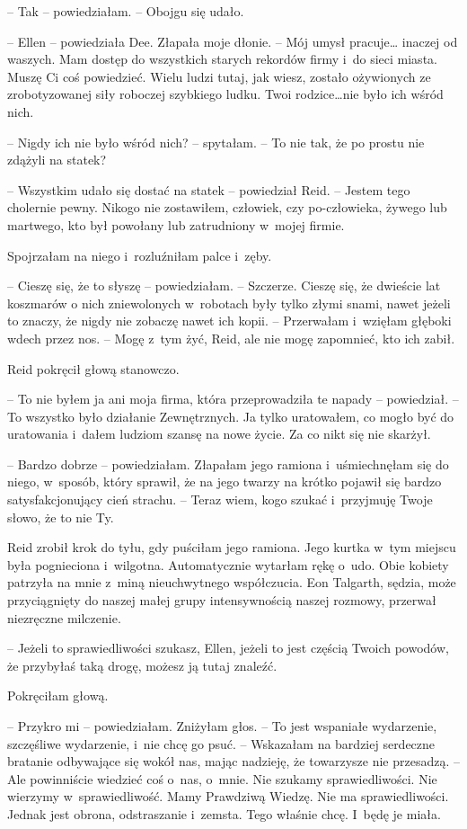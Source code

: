 \documentclass[oneside,polish,11pt,sfheadings]{mwbk}
\begin{document}
-- Tak -- powiedziałam. -- Obojgu się udało.

-- Ellen -- powiedziała Dee. Złapała moje dłonie. -- Mój umysł pracuje\ldots 
inaczej od waszych. Mam dostęp do wszystkich starych rekordów firmy i~do
sieci miasta. Muszę Ci coś powiedzieć. Wielu ludzi tutaj, jak wiesz,
zostało ożywionych ze zrobotyzowanej siły roboczej szybkiego ludku. Twoi
rodzice\ldots  nie było ich wśród nich.

-- Nigdy ich nie było wśród nich? -- spytałam. -- To nie tak, że po prostu
nie zdążyli na statek?

-- Wszystkim udało się dostać na statek -- powiedział Reid. -- Jestem tego
cholernie pewny. Nikogo nie zostawiłem, człowiek, czy po-człowieka,
żywego lub martwego, kto był powołany lub zatrudniony w~mojej firmie.

Spojrzałam na niego i~rozluźniłam palce i~zęby. 

-- Cieszę się, że to
słyszę -- powiedziałam. -- Szczerze. Cieszę się, że dwieście lat koszmarów
o nich zniewolonych w~robotach były tylko złymi snami, nawet jeżeli to
znaczy, że nigdy nie zobaczę nawet ich kopii. -- Przerwałam i~wzięłam
głęboki wdech przez nos. -- Mogę z~tym żyć, Reid, ale nie mogę zapomnieć,
kto ich zabił.

Reid pokręcił głową stanowczo. 

-- To nie byłem ja ani moja firma, która
przeprowadziła te napady -- powiedział. -- To wszystko było działanie
Zewnętrznych. Ja tylko uratowałem, co mogło być do uratowania i~dałem
ludziom szansę na nowe życie. Za co nikt się nie skarżył.

-- Bardzo dobrze -- powiedziałam. Złapałam jego ramiona i~uśmiechnęłam się
do niego, w~sposób, który sprawił, że na jego twarzy na krótko pojawił
się bardzo satysfakcjonujący cień strachu. -- Teraz wiem, kogo szukać i~przyjmuję Twoje słowo, że to nie Ty.

Reid zrobił krok do tyłu, gdy puściłam jego ramiona. Jego kurtka w~tym
miejscu była pognieciona i~wilgotna. Automatycznie wytarłam rękę o~udo.
Obie kobiety patrzyła na mnie z~miną nieuchwytnego współczucia. Eon
Talgarth, sędzia, może przyciągnięty do naszej małej grupy
intensywnością naszej rozmowy, przerwał niezręczne milczenie.

-- Jeżeli to sprawiedliwości szukasz, Ellen, jeżeli to jest częścią
Twoich powodów, że przybyłaś taką drogę, możesz ją tutaj znaleźć.

Pokręciłam głową. 

-- Przykro mi -- powiedziałam. Zniżyłam głos. -- To jest
wspaniałe wydarzenie, szczęśliwe wydarzenie, i~nie chcę go psuć. -- Wskazałam na bardziej serdeczne bratanie odbywające się wokół nas, mając
nadzieję, że towarzysze nie przesadzą. -- Ale powinniście wiedzieć coś o~nas, o~mnie. Nie szukamy sprawiedliwości. Nie wierzymy w~sprawiedliwość.
Mamy Prawdziwą Wiedzę. Nie ma sprawiedliwości. Jednak jest obrona,
odstraszanie i~zemsta. Tego właśnie chcę. I~będę je miała.
\end{document}
